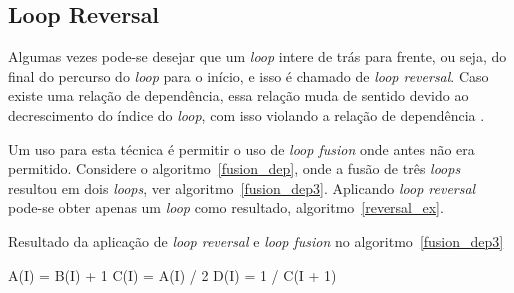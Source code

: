 \subsection{Loop Reversal}

Algumas vezes pode-se desejar que um \textit{loop} intere de trás para frente,
ou seja, do final do percurso do \textit{loop} para o início, e isso é chamado
de \textit{loop reversal}.
Caso existe uma relação de dependência, essa relação muda de sentido devido ao
decrescimento do índice do \textit{loop}, com isso violando a relação de 
dependência \cite{hpcfpc}.

Um uso para esta técnica é permitir o uso de \textit{loop fusion} onde antes não
era permitido. 
Considere o algoritmo~\ref{fusion_dep}, onde a fusão de três \textit{loops}
resultou em dois \textit{loops}, ver algoritmo~\ref{fusion_dep3}. 
Aplicando \textit{loop reversal} pode-se obter apenas um \textit{loop} como
resultado, algoritmo~\ref{reversal_ex}.

\begin{algorithm}
\caption{Resultado da aplicação de \textit{loop reversal} e \textit{loop fusion}
no algoritmo~\ref{fusion_dep3}}
\label{reversal_ex}
\begin{algorithmic}[1]

\STATE A(I) = B(I) + 1
\STATE C(I) = A(I) / 2
\STATE D(I) = 1 / C(I + 1)
\ENDFOR

\end{algorithmic}
\end{algorithm}
